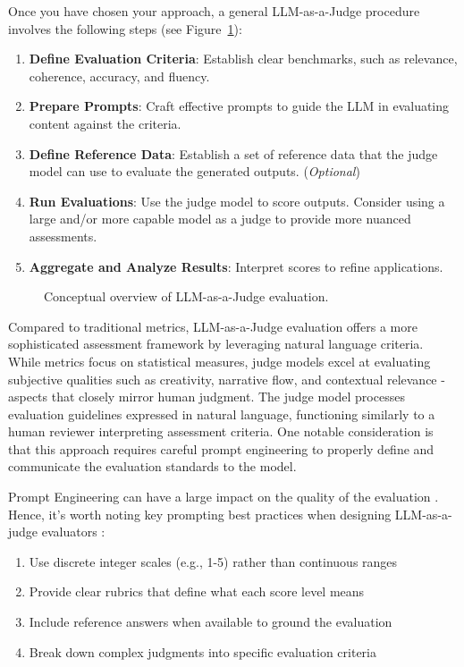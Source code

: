 Once you have chosen your approach, a general LLM-as-a-Judge procedure involves the following steps (see Figure~\ref{fig:llm_judge}):
\begin{enumerate}
    \item \textbf{Define Evaluation Criteria}: Establish clear benchmarks, such as relevance, coherence, accuracy, and fluency.
    \item \textbf{Prepare Prompts}: Craft effective prompts to guide the LLM in evaluating content against the criteria.
    \item \textbf{Define Reference Data}: Establish a set of reference data that the judge model can use to evaluate the generated outputs. (\textit{Optional})
    \item \textbf{Run Evaluations}: Use the judge model to score outputs. Consider using a large and/or more capable model as a judge to provide more nuanced assessments.
    \item \textbf{Aggregate and Analyze Results}: Interpret scores to refine applications.
\end{enumerate}
\begin{figure}[h]
\centering

\caption{Conceptual overview of LLM-as-a-Judge evaluation.}
\label{fig:llm_judge}
\end{figure}

Compared to traditional metrics, LLM-as-a-Judge evaluation offers a more sophisticated assessment framework by leveraging natural language criteria. While metrics focus on statistical measures, judge models excel at evaluating subjective qualities such as creativity, narrative flow, and contextual relevance - aspects that closely mirror human judgment. The judge model processes evaluation guidelines expressed in natural language, functioning similarly to a human reviewer interpreting assessment criteria. One notable consideration is that this approach requires careful prompt engineering to properly define and communicate the evaluation standards to the model.

Prompt Engineering can have a large impact on the quality of the evaluation . Hence, it's worth noting key prompting best practices when designing LLM-as-a-judge evaluators :
\begin{enumerate}
    \item Use discrete integer scales (e.g., 1-5) rather than continuous ranges 
    \item Provide clear rubrics that define what each score level means
    \item Include reference answers when available to ground the evaluation
    \item Break down complex judgments into specific evaluation criteria
\end{enumerate}

